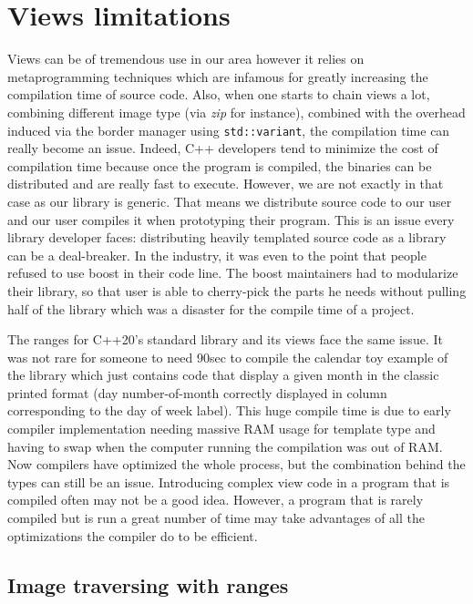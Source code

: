 \section{Views limitations}

Views can be of tremendous use in our area however it relies on metaprogramming techniques which are infamous for
greatly increasing the compilation time of source code. Also, when one starts to chain views a lot, combining different
image type (via \emph{zip} for instance), combined with the overhead induced via the border manager using
\texttt{std::variant}, the compilation time can really become an issue. Indeed, C++ developers tend to minimize the cost
of compilation time because once the program is compiled, the binaries can be distributed and are really fast to
execute. However, we are not exactly in that case as our library is generic. That means we distribute source code to our
user and our user compiles it when prototyping their program. This is an issue every library developer faces:
distributing heavily templated source code as a library can be a deal-breaker. In the industry, it was even to the point
that people refused to use boost in their code line. The boost maintainers had to modularize their library, so that user
is able to cherry-pick the parts he needs without pulling half of the library which was a disaster for the compile time
of a project.

The ranges for C++20's standard library and its views face the same issue. It was not rare for someone to need 90sec to
compile the calendar toy example of the library which just contains code that display a given month in the classic
printed format (day number-of-month correctly displayed in column corresponding to the day of week label). This huge
compile time is due to early compiler implementation needing massive RAM usage for template type and having to swap when
the computer running the compilation was out of RAM. Now compilers have optimized the whole process, but the combination
behind the types can still be an issue. Introducing complex view code in a program that is compiled often may not be a
good idea. However, a program that is rarely compiled but is run a great number of time may take advantages of all the
optimizations the compiler do to be efficient.

\subsection{Image traversing with ranges}
\label{subsec.range.traversing}

